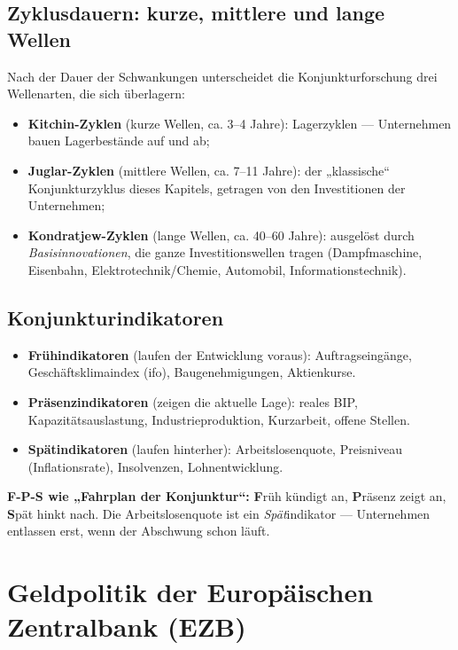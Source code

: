 \documentclass[11pt, a4paper]{article}
\begin{document}
\subsection{Zyklusdauern: kurze, mittlere und lange Wellen}

Nach der Dauer der Schwankungen unterscheidet die Konjunkturforschung drei Wellenarten,
die sich überlagern:

\begin{itemize}
  \item \textbf{Kitchin-Zyklen} (kurze Wellen, ca. 3--4 Jahre): Lagerzyklen ---
    Unternehmen bauen Lagerbestände auf und ab;
  \item \textbf{Juglar-Zyklen} (mittlere Wellen, ca. 7--11 Jahre): der „klassische``
    Konjunkturzyklus dieses Kapitels, getragen von den Investitionen der Unternehmen;
  \item \textbf{Kondratjew-Zyklen} (lange Wellen, ca. 40--60 Jahre): ausgelöst durch
    \emph{Basisinnovationen}, die ganze Investitionswellen tragen (Dampfmaschine,
    Eisenbahn, Elektrotechnik/Chemie, Automobil, Informationstechnik).
\end{itemize}

\subsection{Konjunkturindikatoren}

\begin{itemize}
  \item \textbf{Frühindikatoren} (laufen der Entwicklung voraus): Auftragseingänge,
    Geschäftsklimaindex (ifo), Baugenehmigungen, Aktienkurse.
  \item \textbf{Präsenzindikatoren} (zeigen die aktuelle Lage): reales BIP,
    Kapazitätsauslastung, Industrieproduktion, Kurzarbeit, offene Stellen.
  \item \textbf{Spätindikatoren} (laufen hinterher): Arbeitslosenquote, Preisniveau
    (Inflationsrate), Insolvenzen, Lohnentwicklung.
\end{itemize}

\begin{eselsbruecke}
\textbf{F-P-S wie „Fahrplan der Konjunktur``:} \textbf{F}rüh kündigt an,
\textbf{P}räsenz zeigt an, \textbf{S}pät hinkt nach. Die Arbeitslosenquote ist ein
\emph{Spät}indikator --- Unternehmen entlassen erst, wenn der Abschwung schon läuft.
\end{eselsbruecke}

\section{Geldpolitik der Europäischen Zentralbank (EZB)}
\end{document}
